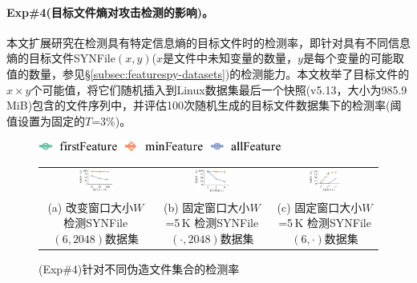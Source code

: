 \paragraph*{Exp\#4(目标文件熵对攻击检测的影响)。}

本文扩展研究\sysnameF 在检测具有特定信息熵的目标文件时的检测率，即针对具有不同信息熵的目标文件SYNFile$(x, y)$($x$是文件中未知变量的数量，$y$是每个变量的可能取值的数量，参见\S\ref{subsec:featurespy-datasets})的检测能力。本文枚举了目标文件的$x\times y$个可能值，将它们随机插入到Linux数据集最后一个快照(v5.13，大小为985.9\,MiB)包含的文件序列中，并评估100次随机生成的目标文件数据集下\sysnameF 的检测率(阈值设置为固定的$T$=3\%)。

\begin{figure}[!htb]
  \centering
  \includegraphics[height=10.5pt]{pic/featurespy/plot/detection/trade-off/trade_off_legend.pdf}
  \vspace{5pt} \\
  \begin{tabular}{@{\ }c@{\ }c@{\ }c}
    \includegraphics[width=0.32\textwidth]{pic/featurespy/plot/detection/trade-off/varyWindow_linux.pdf}    &
    \includegraphics[width=0.32\textwidth]{pic/featurespy/plot/detection/trade-off/varyModifyPos_linux.pdf} &
    \includegraphics[width=0.32\textwidth]{pic/featurespy/plot/detection/trade-off/varyFileNumber_linux.pdf}  \\
    \makecell[c]{\small (a) 改变窗口大小$W$                                                                   \\ \small 检测SYNFile$(6,2048)$数据集} &
    \makecell[c]{\small (b) 固定窗口大小$W$=5\,K                                                              \\ \small 检测SYNFile$(\cdot,2048)$数据集} &
    \makecell[c]{\small (c) 固定窗口大小$W$=5\,K                                                              \\ \small 检测SYNFile$(6,\cdot)$数据集} \\
  \end{tabular}
  \caption{(Exp\#4)针对不同伪造文件集合的检测率}
  \label{fig:featurespy-expDetectionTradeOff}
\end{figure}

